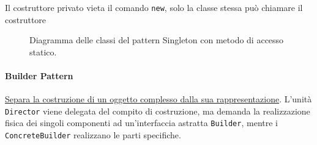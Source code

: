 \documentclass[12pt]{extarticle}
\newcommand{\cn}[1]{\makebox[\linewidth][c]{\textbf{#1}}}
\begin{document}
\noindent Il costruttore privato vieta il comando \texttt{new}, solo la classe stessa può chiamare il costruttore

\begin{figure}[htbp]
\centering
{}
\caption{Diagramma delle classi del pattern Singleton con metodo di accesso statico.}
\label{fig:pattern_singleton_structure}
\end{figure}

\newpage

\paragraph{Builder Pattern} \underline{Separa la costruzione di un oggetto complesso dalla sua rappresentazione}. L'unità \texttt{Director} viene delegata del compito di costruzione, ma demanda la realizzazione fisica dei singoli componenti ad un'interfaccia astratta \texttt{Builder}, mentre i \texttt{ConcreteBuilder} realizzano le parti specifiche.
\end{document}
